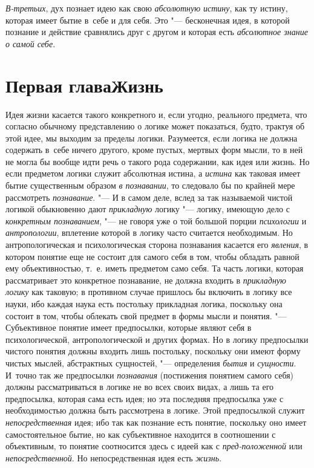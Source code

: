 {\em В-третьих}, дух
познает идею как свою {\em абсолютную
истину}, как ту истину, которая имеет бытие в~себе и для
себя. Это "--- бесконечная идея, в которой познание и действие
сравнялись друг с другом и которая есть
{\em абсолютное знание о самой себе}.

\chapter[Первая глава Жизнь]{Первая глава\newline Жизнь}

Идея жизни касается такого конкретного и, если угодно,
реального предмета, что согласно обычному представлению о логике может
показаться, будто, трактуя об этой идее, мы выходим за пределы логики.
Разумеется, если логика не должна содержать в~себе ничего другого, кроме
пустых, мертвых форм мысли, то в ней не могла бы вообще идти речь о такого
рода содержании, как идея или жизнь. Но если предметом логики служит
абсолютная истина, а {\em истина}
как таковая имеет бытие существенным образом
{\em в познавании}, то
следовало бы по крайней мере рассмотреть {\em познавание}. "--- И в
самом деле, вслед за так называемой чистой логикой обыкновенно дают
{\em прикладную} логику "--- логику, имеющую дело с
{\em конкретным познаванием}, "--- не говоря уже о той большой порции
{\em психологии} и {\em антропологии},
вплетение которой в логику часто считается необходимым. Но
антропологическая и психологическая сторона познавания касается его
{\em явления}, в котором
понятие еще не состоит для самого себя в том, чтобы обладать равной ему
объективностью, т.~е. иметь предметом само себя. Та часть логики, которая
рассматривает это конкретное познавание, не должна входить в
{\em прикладную логику}
как таковую; в противном случае пришлось бы включить в логику
все науки, ибо каждая наука есть постольку прикладная логика, поскольку она
состоит в том, чтобы облекать свой предмет в формы мысли и понятия. "---
Субъективное понятие имеет предпосылки, которые являют себя в
психологической, антропологической и других формах. Но в логику предпосылки
чистого понятия должны входить лишь постольку, поскольку они имеют форму
чистых мыслей, абстрактных сущностей, "--- определения
{\em бытия} и {\em сущности}. И~точно
так же предпосылки {\em познавания}
(постижения понятием самого себя) должны
рассматриваться в логике не во всех своих видах, а лишь та
его предпосылка, которая сама есть идея; но эта последняя предпосылка уже с
необходимостью должна быть рассмотрена в логике. Этой предпосылкой служит
{\em непосредственная}
идея; ибо так как познание есть понятие, поскольку оно имеет
самостоятельное бытие, но как субъективное находится в соотношении с
объективным, то понятие соотносится здесь с идеей как с
{\em пред-положенной} или
{\em непосредственной}.
Но непосредственная идея есть
{\em жизнь}.

